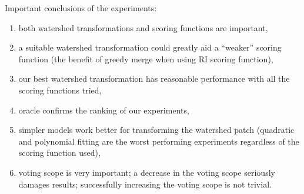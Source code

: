 Important conclusions of the experiments:
\begin{enumerate}
 \item both watershed transformations and scoring functions are important,
 \item a suitable %
 watershed transformation could greatly aid a ``weaker'' scoring function (\eg the benefit of greedy merge when using RI scoring function),
 \item our best watershed transformation has reasonable performance with all the scoring functions tried,
 \item oracle confirms the ranking of our experiments,
 \item simpler models work better for transforming the watershed patch (\eg quadratic and polynomial fitting are the worst performing experiments regardless of the scoring function used),
 \item voting scope is very important; a decrease in the voting scope seriously damages results; successfully increasing the voting scope is not trivial.
\end{enumerate}